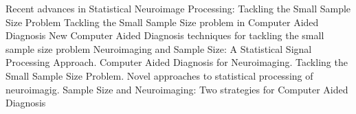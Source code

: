 Recent advances in Statistical Neuroimage Processing: Tackling the Small Sample Size Problem
Tackling the Small Sample Size problem in Computer Aided Diagnosis
New Computer Aided Diagnosis techniques for tackling the small sample size problem
Neuroimaging and Sample Size: A Statistical Signal Processing Approach. 
Computer Aided Diagnosis for Neuroimaging. Tackling the Small Sample Size Problem. 
Novel approaches to statistical processing of neuroimagig. 
Sample Size and Neuroimaging: Two strategies for Computer Aided Diagnosis
